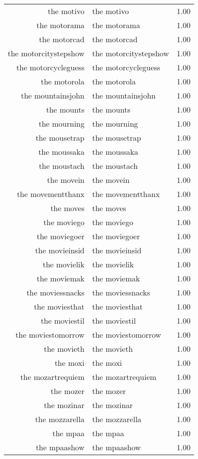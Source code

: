 \begin{table}[ht]
\begin{tabular}{rlr}
  the motivo & the motivo & 1.00 \\ 
  the motorama & the motorama & 1.00 \\ 
  the motorcad & the motorcad & 1.00 \\ 
  the motorcitystepshow & the motorcitystepshow & 1.00 \\ 
  the motorcycleguess & the motorcycleguess & 1.00 \\ 
  the motorola & the motorola & 1.00 \\ 
  the mountainsjohn & the mountainsjohn & 1.00 \\ 
  the mounts & the mounts & 1.00 \\ 
  the mourning & the mourning & 1.00 \\ 
  the mousetrap & the mousetrap & 1.00 \\ 
  the moussaka & the moussaka & 1.00 \\ 
  the moustach & the moustach & 1.00 \\ 
  the movein & the movein & 1.00 \\ 
  the movementthanx & the movementthanx & 1.00 \\ 
  the moves & the moves & 1.00 \\ 
  the moviego & the moviego & 1.00 \\ 
  the moviegoer & the moviegoer & 1.00 \\ 
  the movieinsid & the movieinsid & 1.00 \\ 
  the movielik & the movielik & 1.00 \\ 
  the moviemak & the moviemak & 1.00 \\ 
  the moviessnacks & the moviessnacks & 1.00 \\ 
  the moviesthat & the moviesthat & 1.00 \\ 
  the moviestil & the moviestil & 1.00 \\ 
  the moviestomorrow & the moviestomorrow & 1.00 \\ 
  the movieth & the movieth & 1.00 \\ 
  the moxi & the moxi & 1.00 \\ 
  the mozartrequiem & the mozartrequiem & 1.00 \\ 
  the mozer & the mozer & 1.00 \\ 
  the mozinar & the mozinar & 1.00 \\ 
  the mozzarella & the mozzarella & 1.00 \\ 
  the mpaa & the mpaa & 1.00 \\ 
  the mpaashow & the mpaashow & 1.00 \\ 

\end{tabular}
\end{table}
